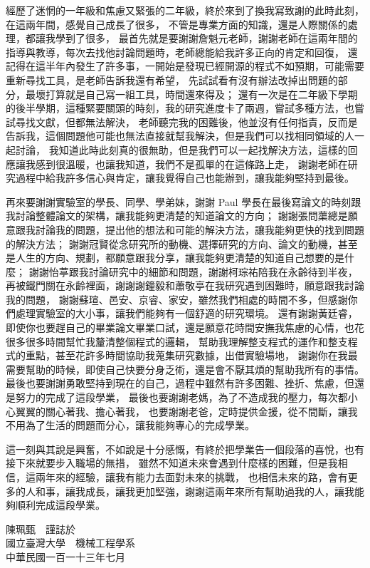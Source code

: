 \begin{acknowledgementsCH}
    \fontsize{12pt}{18pt}\selectfont
    經歷了迷惘的一年級和焦慮又緊張的二年級，終於來到了換我寫致謝的此時此刻，在這兩年間，感覺自己成長了很多，
    不管是專業方面的知識，還是人際關係的處理，都讓我學到了很多，
    最首先就是要謝謝詹魁元老師，謝謝老師在這兩年間的指導與教導，每次去找他討論問題時，老師總能給我許多正向的肯定和回復，
    還記得在這半年內發生了許多事，一開始是發現已經開源的程式不如預期，可能需要重新尋找工具，是老師告訴我還有希望，
    先試試看有沒有辦法改掉出問題的部分，最壞打算就是自己寫一組工具，時間還來得及；
    還有一次是在二年級下學期的後半學期，這種緊要關頭的時刻，我的研究進度卡了兩週，嘗試多種方法，也嘗試尋找文獻，但都無法解決，
    老師聽完我的困難後，他並沒有任何指責，反而是告訴我，這個問題他可能也無法直接就幫我解決，但是我們可以找相同領域的人一起討論，
    我知道此時此刻真的很無助，但是我們可以一起找解決方法，這樣的回應讓我感到很溫暖，也讓我知道，我們不是孤單的在這條路上走，
    謝謝老師在研究過程中給我許多信心與肯定，讓我覺得自己也能辦到，讓我能夠堅持到最後。

    再來要謝謝實驗室的學長、同學、學弟妹，謝謝 Paul 學長在最後寫論文的時刻跟我討論整體論文的架構，讓我能夠更清楚的知道論文的方向；
    謝謝張問蕖總是願意跟我討論我的問題，提出他的想法和可能的解決方法，讓我能夠更快的找到問題的解決方法；
    謝謝冠賢從念研究所的動機、選擇研究的方向、論文的動機，甚至是人生的方向、規劃，都願意跟我分享，讓我能夠更清楚的知道自己想要的是什麼；
    謝謝怡葶跟我討論研究中的細節和問題，謝謝柯琮祐陪我在永齡待到半夜，再被鐵門關在永齡裡面，謝謝謝鐘毅和蕭敬亭在我研究遇到困難時，願意跟我討論我的問題，
    謝謝蘇瑄、邑安、京睿、家安，雖然我們相處的時間不多，但感謝你們處理實驗室的大小事，讓我們能夠有一個舒適的研究環境。
    還有謝謝黃廷睿，即使你也要趕自己的畢業論文畢業口試，還是願意花時間安撫我焦慮的心情，也花很多很多時間幫忙我釐清整個程式的邏輯，
    幫助我理解整支程式的運作和整支程式的重點，甚至花許多時間協助我蒐集研究數據，出借實驗場地，
    謝謝你在我最需要幫助的時候，即使自己快要分身乏術，還是會不厭其煩的幫助我所有的事情。
    最後也要謝謝勇敢堅持到現在的自己，過程中雖然有許多困難、挫折、焦慮，但還是努力的完成了這段學業，
    最後也要謝謝老媽，為了不造成我的壓力，每次都小心翼翼的關心著我、擔心著我，
    也要謝謝老爸，定時提供金援，從不間斷，讓我不用為了生活的問題而分心，讓我能夠專心的完成學業。
    
    這一刻與其說是興奮，不如說是十分感慨，有終於把學業告一個段落的喜悅，也有接下來就要步入職場的無措，
    雖然不知道未來會遇到什麼樣的困難，但是我相信，這兩年來的經驗，讓我有能力去面對未來的挑戰，
    也相信未來的路，會有更多的人和事，讓我成長，讓我更加堅強，謝謝這兩年來所有幫助過我的人，讓我能夠順利完成這段學業。

    \begin{flushright}
        陳珮甄　謹誌於\\
        國立臺灣大學　機械工程學系\\
        中華民國一百一十三年七月
    \end{flushright}
 
\end{acknowledgementsCH}